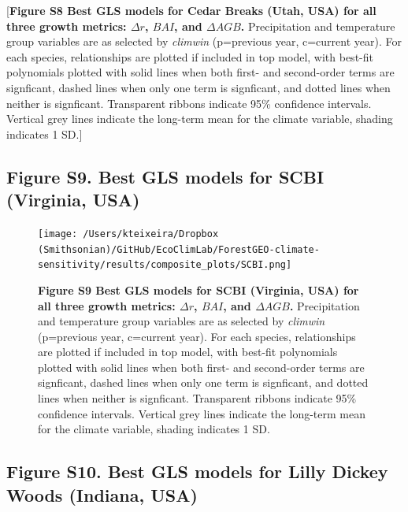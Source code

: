 \documentclass[
]{article}
\begin{document}
{[}\textbf{Figure S8 \textbar{} Best GLS models for Cedar Breaks (Utah,
USA) for all three growth metrics: \(\Delta r\), \(BAI\), and
\(\Delta AGB\).} Precipitation and temperature group variables are as
selected by \emph{climwin} (p=previous year, c=current year). For each
species, relationships are plotted if included in top model, with
best-fit polynomials plotted with solid lines when both first- and
second-order terms are signficant, dashed lines when only one term is
signficant, and dotted lines when neither is signficant. Transparent
ribbons indicate 95\% confidence intervals. Vertical grey lines indicate
the long-term mean for the climate variable, shading indicates 1 SD.{]}

\newpage

\hypertarget{figure-s9.-best-gls-models-for-scbi-virginia-usa}{%
\subsection{Figure S9. Best GLS models for SCBI (Virginia,
USA)}\label{figure-s9.-best-gls-models-for-scbi-virginia-usa}}

\begin{figure}
\centering
\texttt{[image: /Users/kteixeira/Dropbox (Smithsonian)/GitHub/EcoClimLab/ForestGEO-climate-sensitivity/results/composite\_plots/SCBI.png]}
\caption{\textbf{Figure S9 \textbar{} Best GLS models for SCBI
(Virginia, USA) for all three growth metrics: \(\Delta r\), \(BAI\), and
\(\Delta AGB\).} Precipitation and temperature group variables are as
selected by \emph{climwin} (p=previous year, c=current year). For each
species, relationships are plotted if included in top model, with
best-fit polynomials plotted with solid lines when both first- and
second-order terms are signficant, dashed lines when only one term is
signficant, and dotted lines when neither is signficant. Transparent
ribbons indicate 95\% confidence intervals. Vertical grey lines indicate
the long-term mean for the climate variable, shading indicates 1 SD.}
\end{figure}

\newpage

\hypertarget{figure-s10.-best-gls-models-for-lilly-dickey-woods-indiana-usa}{%
\subsection{Figure S10. Best GLS models for Lilly Dickey Woods (Indiana,
USA)}\label{figure-s10.-best-gls-models-for-lilly-dickey-woods-indiana-usa}}
\end{document}
